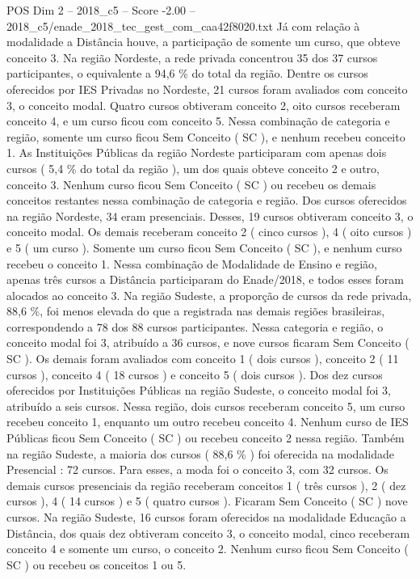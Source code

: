 \begin{textsample}{POS Dim 2 – 2018\_c5 – Score -2.00 – 2018\_c5/enade\_2018\_tec\_gest\_com\_caa42f8020.txt}
Já com relação à modalidade a Distância houve, a participação de somente um curso, que obteve conceito 3.
Na região Nordeste, a rede privada concentrou 35 dos 37 cursos participantes, o equivalente a 94,6 \% do total da região.
Dentre os cursos oferecidos por IES Privadas no Nordeste, 21 cursos foram avaliados com conceito 3, o conceito modal.
Quatro cursos obtiveram conceito 2, oito cursos receberam conceito 4, e um curso ficou com conceito 5.
Nessa combinação de categoria e região, somente um curso ficou Sem Conceito ( SC ), e nenhum recebeu conceito 1.
As Instituições Públicas da região Nordeste participaram com apenas dois cursos ( 5,4 \% do total da região ), um dos quais obteve conceito 2 e outro, conceito 3.
Nenhum curso ficou Sem Conceito ( SC ) ou recebeu os demais conceitos restantes nessa combinação de categoria e região.
Dos cursos oferecidos na região Nordeste, 34 eram presenciais.
Desses, 19 cursos obtiveram conceito 3, o conceito modal.
Os demais receberam conceito 2 ( cinco cursos ), 4 ( oito cursos ) e 5 ( um curso ).
Somente um curso ficou Sem Conceito ( SC ), e nenhum curso recebeu o conceito 1.
Nessa combinação de Modalidade de Ensino e região, apenas três cursos a Distância participaram do Enade/2018, e todos esses foram alocados ao conceito 3.
Na região Sudeste, a proporção de cursos da rede privada, 88,6 \%, foi menos elevada do que a registrada nas demais regiões brasileiras, correspondendo a 78 dos 88 cursos participantes.
Nessa categoria e região, o conceito modal foi 3, atribuído a 36 cursos, e nove cursos ficaram Sem Conceito ( SC ).
Os demais foram avaliados com conceito 1 ( dois cursos ), conceito 2 ( 11 cursos ), conceito 4 ( 18 cursos ) e conceito 5 ( dois cursos ).
Dos dez cursos oferecidos por Instituições Públicas na região Sudeste, o conceito modal foi 3, atribuído a seis cursos.
Nessa região, dois cursos receberam conceito 5, um curso recebeu conceito 1, enquanto um outro recebeu conceito 4.
Nenhum curso de IES Públicas ficou Sem Conceito ( SC ) ou recebeu conceito 2 nessa região.
Também na região Sudeste, a maioria dos cursos ( 88,6 \% ) foi oferecida na modalidade Presencial : 72 cursos.
Para esses, a moda foi o conceito 3, com 32 cursos.
Os demais cursos presenciais da região receberam conceitos 1 ( três cursos ), 2 ( dez cursos ), 4 ( 14 cursos ) e 5 ( quatro cursos ).
Ficaram Sem Conceito ( SC ) nove cursos.
Na região Sudeste, 16 cursos foram oferecidos na modalidade Educação a Distância, dos quais dez obtiveram conceito 3, o conceito modal, cinco receberam conceito 4 e somente um curso, o conceito 2.
Nenhum curso ficou Sem Conceito ( SC ) ou recebeu os conceitos 1 ou 5.

\end{textsample}
